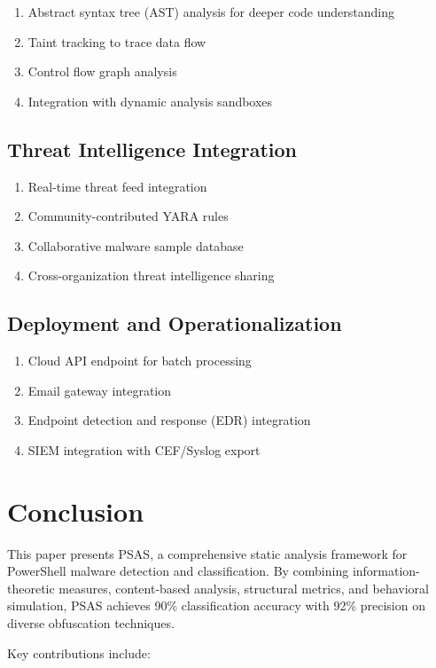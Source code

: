 \documentclass[10pt,conference,a4paper]{IEEEtran}
\begin{document}
\begin{enumerate}
\item Abstract syntax tree (AST) analysis for deeper code understanding
\item Taint tracking to trace data flow
\item Control flow graph analysis
\item Integration with dynamic analysis sandboxes
\end{enumerate}

\subsection{Threat Intelligence Integration}

\begin{enumerate}
\item Real-time threat feed integration
\item Community-contributed YARA rules
\item Collaborative malware sample database
\item Cross-organization threat intelligence sharing
\end{enumerate}

\subsection{Deployment and Operationalization}

\begin{enumerate}
\item Cloud API endpoint for batch processing
\item Email gateway integration
\item Endpoint detection and response (EDR) integration
\item SIEM integration with CEF/Syslog export
\end{enumerate}

\section{Conclusion}

This paper presents PSAS, a comprehensive static analysis framework for PowerShell malware detection and classification. By combining information-theoretic measures, content-based analysis, structural metrics, and behavioral simulation, PSAS achieves 90\% classification accuracy with 92\% precision on diverse obfuscation techniques.

Key contributions include:
\end{document}
